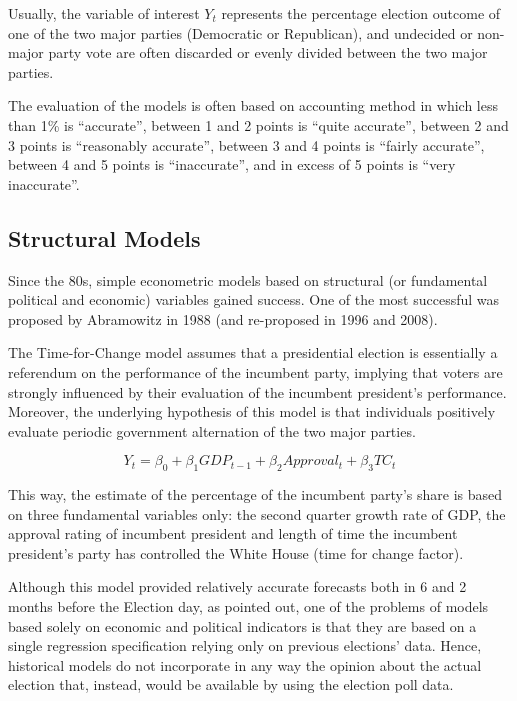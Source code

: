 \documentclass[
  12pt]{article}
\begin{document}
Usually, the variable of interest \(Y_t\) represents the percentage
election outcome of one of the two major parties (Democratic or
Republican), and undecided or non-major party vote are often discarded
or evenly divided between the two major parties.

The evaluation of the models is often based on \citet{cam:1996}
accounting method in which less than 1\% is ``accurate'', between 1 and
2 points is ``quite accurate'', between 2 and 3 points is ``reasonably
accurate'', between 3 and 4 points is ``fairly accurate'', between 4 and
5 points is ``inaccurate'', and in excess of 5 points is ``very
inaccurate''.

\hypertarget{structural-models}{%
\subsection{Structural Models}\label{structural-models}}

Since the 80s, simple econometric models based on structural (or
fundamental political and economic) variables gained success. One of the
most successful was proposed by Abramowitz in 1988 (and re-proposed in
1996 and 2008).

The Time-for-Change model \citep{abr:2008} assumes that a presidential
election is essentially a referendum on the performance of the incumbent
party, implying that voters are strongly influenced by their evaluation
of the incumbent president's performance. Moreover, the underlying
hypothesis of this model is that individuals positively evaluate
periodic government alternation of the two major parties.

\[ Y_t = \beta_0 + \beta_1 GDP_{t-1} + \beta_2 Approval_t + \beta_3 TC_t \]

This way, the estimate of the percentage of the incumbent party's share
is based on three fundamental variables only: the second quarter growth
rate of GDP, the approval rating of incumbent president and length of
time the incumbent president's party has controlled the White House
(time for change factor).

Although this model provided relatively accurate forecasts both in 6 and
2 months before the Election day, as \citet{gel:kin:1993} pointed out,
one of the problems of models based solely on economic and political
indicators is that they are based on a single regression specification
relying only on previous elections' data. Hence, historical models do
not incorporate in any way the opinion about the actual election that,
instead, would be available by using the election poll data.
\end{document}
